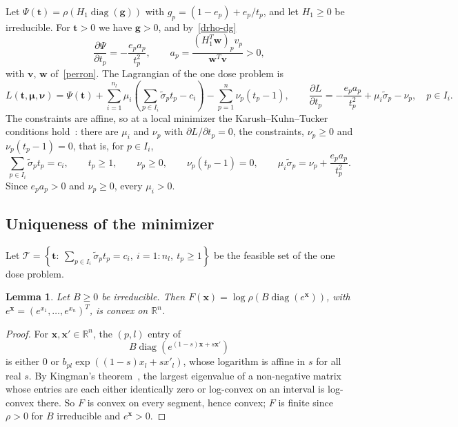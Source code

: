 \documentclass[11pt]{article}
\theoremstyle{plain}
\newtheorem{lemma}[theorem]{Lemma}
\theoremstyle{remark}
\numberwithin{equation}{section}
\begin{document}
Let $\Psi(\bm t)=\rho\left(H_1\operatorname{diag}(\bm g)\right)$ with
$g_p=(1-e_p)+e_p/t_p$, and let $H_1\ge 0$ be irreducible. For $\bm t>0$ we
have $\bm g>0$, and by~\eqref{drho-dg}
\begin{equation}\label{a-p}
\frac{\partial\Psi}{\partial t_p}=-\frac{e_pa_p}{t_p^2},\qquad
a_p=\frac{\left(H_1^T\bm w\right)_pv_p}{\bm w^T\bm v}>0,
\end{equation}
with $\bm v$, $\bm w$ of~\eqref{perron}. The Lagrangian of the one dose problem is
\begin{equation*}
L(\bm t,\bm\mu,\bm\nu)=\Psi(\bm t)
+\sum_{i=1}^{n_l}\mu_i\left(\sum_{p\in I_i}\widetilde\sigma_pt_p-c_i\right)
-\sum_{p=1}^n\nu_p\left(t_p-1\right),
\qquad
\frac{\partial L}{\partial t_p}=-\frac{e_pa_p}{t_p^2}+\mu_i\widetilde\sigma_p-\nu_p,
\quad p\in I_i .
\end{equation*}
The constraints are affine, so at a local minimizer the Karush--Kuhn--Tucker
conditions hold~\cite[Section~3.4]{1999Bertsekas}: there are $\mu_i$ and
$\nu_p$ with $\partial L/\partial t_p=0$, the constraints, $\nu_p\ge 0$ and
$\nu_p(t_p-1)=0$, that is, for $p\in I_i$,
\begin{equation}\label{kkt}
\sum_{p\in I_i}\widetilde\sigma_pt_p=c_i,\qquad t_p\ge 1,\qquad\nu_p\ge 0,\qquad
\nu_p(t_p-1)=0,\qquad
\mu_i\widetilde\sigma_p=\nu_p+\frac{e_pa_p}{t_p^2}.
\end{equation}
Since $e_pa_p>0$ and $\nu_p\ge 0$, every $\mu_i>0$.

\subsection{Uniqueness of the minimizer}\label{sec-unique}

Let $\mathcal{T}=\left\{\bm t:\ \sum_{p\in I_i}\widetilde\sigma_pt_p=c_i,\ i=1:n_l,\ t_p\ge 1\right\}$
be the feasible set of the one dose problem.

\begin{lemma}\label{kingman}
Let $B\ge 0$ be irreducible. Then $F(\bm x)=\log\rho\left(B\operatorname{diag}(e^{\bm x})\right)$,
with $e^{\bm x}=(e^{x_1},\ldots,e^{x_n})^T$, is convex on $\mathbb{R}^n$.
\end{lemma}
\begin{proof}
For $\bm x,\bm x'\in\mathbb{R}^n$, the $(p,l)$ entry of
\begin{equation*}
B\operatorname{diag}\left(e^{(1-s)\bm x+s\bm x'}\right)
\end{equation*}
is either $0$ or $b_{pl}\exp\left((1-s)x_l+sx'_l\right)$, whose logarithm is
affine in $s$ for all real $s$. By Kingman's theorem~\cite{1961Kingman-aa}, the largest eigenvalue of
a non-negative matrix whose entries are each either identically zero or
log-convex on an interval is log-convex there. So $F$ is convex on every
segment, hence convex; $F$ is finite since $\rho>0$ for $B$ irreducible and
$e^{\bm x}>0$.
\end{proof}
\end{document}
